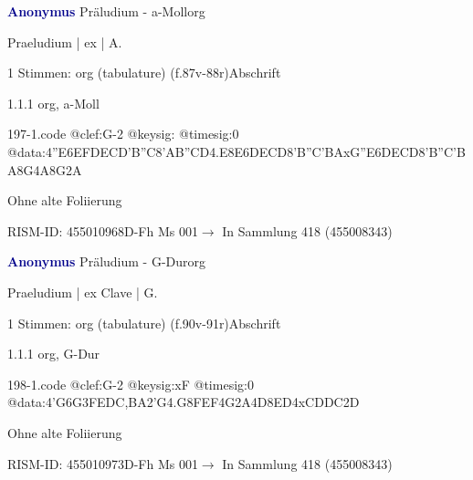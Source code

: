 \documentclass[twocolumn]{book}
\begin{document}
\par \vspace{7pt} \textcolor{darkblue}{\textbf{Anonymus  }}\hfillplus{\textbf{[197]}}\newline Präludium - a-Moll\newline org
\par \begin{itshape}[f.87v, at left:] Praeludium | ex | A.\end{itshape} 
\par \textcolor{darkblue}{}  1 Stimmen: org (tabulature)  (f.87v-88r)\newline Abschrift
\par 1.1.1  org, a-Moll  
\begin{filecontents*}{197-1.code}
@clef:G-2
@keysig:
@timesig:0
@data:4''E{6EFDE}{CD'B''C}{8'AB}{''CD}4.E8E{6DECD}{8'B''C'BA}{xG''E}{6DECD}{8'B''C'BA}8G4A8G2A
\end{filecontents*}
\newline
%
\par Ohne alte Foliierung
\par RISM-ID: 455010968\newline D-Fh  Ms 001\newline $\rightarrow$ In Sammlung 418 (455008343)
      
\par \vspace{7pt} \textcolor{darkblue}{\textbf{Anonymus  }}\hfillplus{\textbf{[198]}}\newline Präludium - G-Dur\newline org
\par \begin{itshape}[f.90v, at left:] Praeludium | ex Clave | G.\end{itshape} 
\par \textcolor{darkblue}{}  1 Stimmen: org (tabulature)  (f.90v-91r)\newline Abschrift
\par 1.1.1  org, G-Dur  
\begin{filecontents*}{198-1.code}
@clef:G-2
@keysig:xF
@timesig:0
@data:4'G{6G3FE}{DC,BA}2'G4.G8F{EF}4G2A4D{8ED}4xCDDC2D
\end{filecontents*}
\newline
%
\par Ohne alte Foliierung
\par RISM-ID: 455010973\newline D-Fh  Ms 001\newline $\rightarrow$ In Sammlung 418 (455008343)
      
\end{document}
